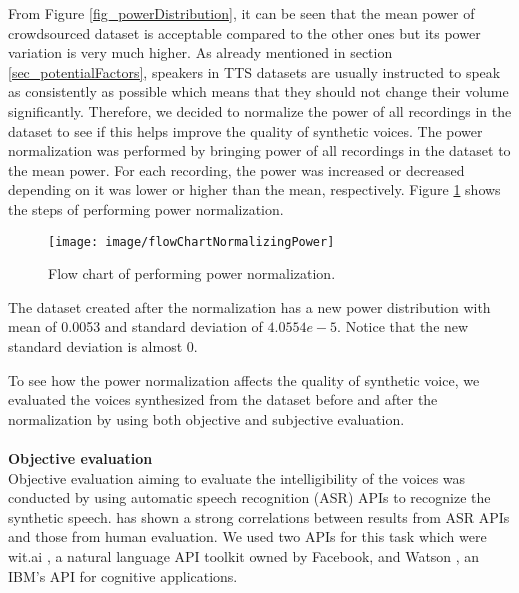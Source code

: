 \documentclass[12pt]{article}
\begin{document}
From Figure \ref{fig_powerDistribution}, it can be seen that the mean power of crowdsourced dataset is acceptable compared to the other ones but its power variation is very much higher. As already mentioned in section \ref{sec_potentialFactors}, speakers in TTS datasets are usually instructed to speak as consistently as possible \cite{buildingCorpus} which means that they should not change their volume significantly. Therefore, we decided to normalize the power of all recordings in the dataset to see if this helps improve the quality of synthetic voices. The power normalization was performed by bringing power of all recordings in the dataset to the mean power. For each recording, the power was increased or decreased depending on it was lower or higher than the mean, respectively. Figure \ref{fig_normalizingPower} shows the steps of performing power normalization.
\begin{figure}[t]
\begin{center}
\texttt{[image: image/flowChartNormalizingPower]}
\end{center}
\vspace{-0.3cm}
\caption[Flow chart of performing power normalization.]{Flow chart of performing power normalization.}
\label{fig_normalizingPower}
\end{figure}
The dataset created after the normalization has a new power distribution with mean of 0.0053 and standard deviation of $4.0554e-5$. Notice that the new standard deviation is almost 0.

To see how the power normalization affects the quality of synthetic voice, we evaluated the voices synthesized from the dataset before and after the normalization by using both objective and subjective evaluation.\\\\
\textbf{Objective evaluation}
\vspace{0.28cm}\\
Objective evaluation aiming to evaluate the intelligibility of the voices was conducted by using automatic speech recognition (ASR) APIs to recognize the synthetic speech. \cite{utteranceSelectionCooper2017} has shown a strong correlations between results from ASR APIs and those from human evaluation. We used two APIs for this task which were wit.ai \cite{witai}, a natural language API toolkit owned by Facebook, and Watson \cite{watson}, an IBM’s API for cognitive applications.
\end{document}
